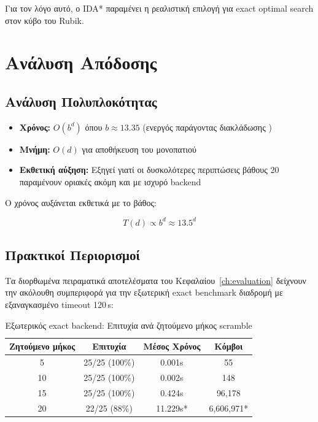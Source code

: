 Για τον λόγο αυτό, ο IDA* παραμένει η ρεαλιστική επιλογή για exact optimal search στον κύβο του Rubik.

\section{Ανάλυση Απόδοσης}

\subsection{Ανάλυση Πολυπλοκότητας}

\begin{itemize}
    \item \textbf{Χρόνος:} $O(b^d)$ όπου $b \approx 13.35$ (ενεργός παράγοντας διακλάδωσης \cite{korf1997finding,korf2001timecomplexity})
    \item \textbf{Μνήμη:} $O(d)$ για αποθήκευση του μονοπατιού
    \item \textbf{Εκθετική αύξηση:} Εξηγεί γιατί οι δυσκολότερες περιπτώσεις βάθους 20 παραμένουν οριακές ακόμη και με ισχυρό backend
\end{itemize}

Ο χρόνος αυξάνεται εκθετικά με το βάθος:

\begin{equation}
T(d) \propto b^d \approx 13.5^d
\end{equation}

\subsection{Πρακτικοί Περιορισμοί}

Τα διορθωμένα πειραματικά αποτελέσματα του Κεφαλαίου~\ref{ch:evaluation}
δείχνουν την ακόλουθη συμπεριφορά για την εξωτερική exact benchmark διαδρομή
με εξαναγκασμένο timeout 120\,s:

\begin{table}[htbp]
\centering
\caption{Εξωτερικός exact backend: Επιτυχία ανά ζητούμενο μήκος scramble}
\label{tab:korf_performance}
\begin{tabular}{|c|c|c|c|}
\hline
\textbf{Ζητούμενο μήκος} & \textbf{Επιτυχία} & \textbf{Μέσος Χρόνος} & \textbf{Κόμβοι} \\
\hline
5 & 25/25 (100\%) & 0.001s & 55 \\
10 & 25/25 (100\%) & 0.002s & 148 \\
15 & 25/25 (100\%) & 0.424s & 96{,}178 \\
20 & 22/25 (88\%) & 11.229s* & 6{,}606{,}971* \\
\hline
\end{tabular}
\end{table}

